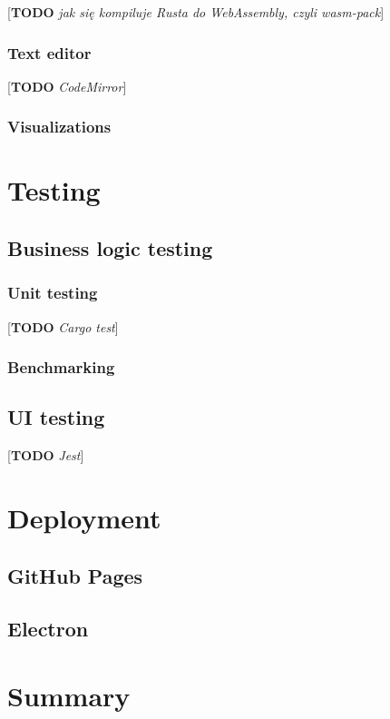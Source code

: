 \documentclass[english,engineering]{wizthesis}
\newcommand{\todo}[1]{{\color{red}[\textbf{TODO} \textit{#1}]}}
\begin{document}
\todo{jak się kompiluje Rusta do WebAssembly, czyli wasm-pack}

\subsection{Text editor}

\todo{CodeMirror}

\subsection{Visualizations}

\chapter{Testing}

\section{Business logic testing}

\subsection{Unit testing}

\todo{Cargo test}

\subsection{Benchmarking}

\section{UI testing}

\todo{Jest}

\chapter{Deployment}

\section{GitHub Pages}

\section{Electron}

{\backmatter %
\chapter{Summary}}
\end{document}
